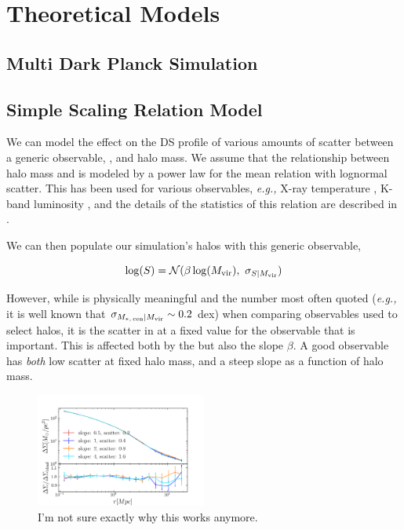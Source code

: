 \documentclass[a4paper,fleqn,usenatbib]{mnras}
\begin{document}
%


\section{Theoretical Models}
    \label{sec:model}

\subsection{Multi Dark Planck Simulation}

\subsection{Simple Scaling Relation Model}

We can model the effect on the DS profile of various amounts of scatter between a generic observable, \obsSym{}, and halo mass.
We assume that the relationship between halo mass and \obsSym{} is modeled by a power law for the mean relation with lognormal scatter. This has been used for various observables, {\it e.g.,\/} X-ray temperature \citet{Lieu2016}, K-band luminosity \citet{Ziparo2016}, and the details of the statistics of this relation are described in \citet{Evrard2014}.

We can then populate our simulation's halos with this generic observable,

\begin{equation}
    \log(S) = \mathcal{N}(\beta \log(M_{\rm vir}{}),\ \sigma_{S{} | M_{\rm vir}{}})
\end{equation}

However, while \scatterObsSymMhalo{} is physically meaningful and the number most often quoted ({\it e.g.,\/} it is well known that $\sigma_{M_{\ast,\,\rm cen} | M_{\rm vir}{}} \sim 0.2$ dex) when comparing observables used to select halos, it is the scatter in \Mhalo{} at a fixed value for the observable \scatterMhaloObsSym{} that is important. This is affected both by the \scatterObsSymMhalo{} but also the slope $\beta$. A good observable has {\em both} low scatter at fixed halo mass, and a steep slope as a function of halo mass.

\begin{figure}
  \centering
  \includegraphics[width=0.5\textwidth]{fig/scatter_slope_degen.png}
  \caption{I'm not sure exactly why this works anymore.}
      \label{fig:scatter_slope_degen}
\end{figure}
\end{document}
